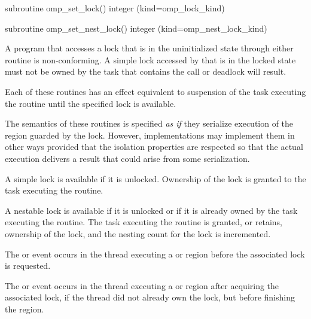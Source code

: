 \begin{fortranspecific}
\begin{ompfSubroutine}
subroutine omp_set_lock()
integer (kind=omp_lock_kind) 

subroutine omp_set_nest_lock()
integer (kind=omp_nest_lock_kind) 
\end{ompfSubroutine}
\end{fortranspecific}

\constraints
A program that accesses a lock that is in the uninitialized state through either routine is
non-conforming. A simple lock accessed by  that is in the locked state
must not be owned by the task that contains the call or deadlock will result.

\effect
Each of these routines has an effect equivalent to suspension of the task
executing the routine until the specified lock is available.


\begin{note} The semantics of these routines is specified
\emph{as if} they serialize execution of the region guarded by the
lock. However, implementations may implement them in other ways
provided that the isolation properties are respected so that the
actual execution delivers a result that could arise from some
serialization.
\end{note}

A simple lock is available if it is unlocked. Ownership of the lock is
granted to the task executing the routine.

A nestable lock is available if it is unlocked or if it is already owned by
the task executing the routine. The task executing the routine is granted,
or retains, ownership of the lock, and the nesting count for the lock is
incremented.

\events

The  or  event occurs in the thread
executing a  or  region
before the associated lock is requested.

The  or  event occurs in the thread
executing a  or  region
after acquiring the associated lock, if the thread did not already own the lock,
but before finishing the region.

